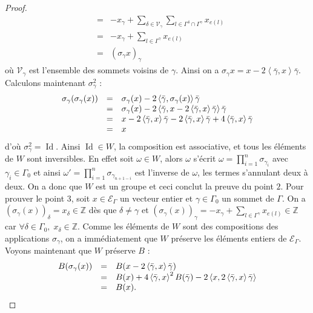 \documentclass[a4paper,11pt]{article}
\DeclareMathOperator{\Id}{Id}
\newcommand{\ps}[2]{\left\langle#1,#2\right\rangle}
\newcommand{\EG}{\mathscr{E}_\Gamma}
\newcommand{\dps}{\displaystyle}
\begin{document}
\begin{proof}
\begin{eqnarray*}
			&=& -x_\gamma+\sum_{\delta\in \mathscr V_\gamma}\sum_{l\in\Gamma^\delta\cap\Gamma^\gamma}x_{e(l)}\\
			&=& -x_\gamma+\sum_{l\in\Gamma^\gamma}x_{e(l)}\\
			&=& (\sigma_\gamma x)_\gamma
		\end{eqnarray*}
			où $\mathscr V_\gamma$ est l'ensemble des sommets voisins de $\gamma$. Ainsi on a $\sigma_\gamma x=x-2\ps{\bar\gamma}{x}\bar\gamma$. Calculons maintenant $\sigma_\gamma^2$ :
			\[
		\begin{array}{>{\dps}r>{\dps}l>{\dps}l}
			\sigma_\gamma(\sigma_\gamma(x))&=& \sigma_\gamma(x)-2\ps{\bar\gamma}{\sigma_\gamma(x)}\bar\gamma\\
			&=& \sigma_\gamma(x)-2\ps{\bar\gamma}{x-2\ps{\bar\gamma}{x}\bar\gamma}\bar\gamma\\
			&=& x-2\ps{\bar\gamma}{x}\bar\gamma-2\ps{\bar\gamma}{x}\bar\gamma+4\ps{\bar\gamma}{x}\bar\gamma\\
			&=& x\\
		\end{array}
			\]
			d'où $\sigma_\gamma^2=\Id$. Ainsi $\Id\in W$, la composition est associative, et tous les éléments de $W$ sont inversibles. En effet soit $\omega\in W$, alors $\omega$ s'écrit $\omega=\prod_{i=1}^n \sigma_{\gamma_i}$ avec $\gamma_i\in\Gamma_0$ et ainsi $\omega'=\prod_{i=1}^n \sigma_{\gamma_{n+1-i}}$ est l'inverse de $\omega$, les termes s'annulant deux à deux. On a donc que $W$ est un groupe et ceci conclut la preuve du point $2$. Pour prouver le point $3$, soit $x\in\EG$ un vecteur entier et $\gamma\in\Gamma_0$ un sommet de $\Gamma$. On a $(\sigma_\gamma(x))_\delta=x_\delta\in\mathbb Z$ dès que $\delta\neq\gamma$ et $(\sigma_\gamma(x))_\gamma=-x_\gamma+\sum_{l\in\Gamma^\gamma}x_{e(l)}\in\mathbb Z$ car $\forall \delta\in\Gamma_0,\;x_\delta\in\mathbb Z$. Comme les éléments de $W$ sont des compositions des applications $\sigma_\gamma$, on a immédiatement que $W$ préserve les éléments entiers de $\EG$. Voyons maintenant que $W$ préserve $B$ :
			\[
		\begin{array}{>{\dps}r>{\dps}l>{\dps}l}
			B(\sigma_\gamma(x))&=& B(x-2\ps{\bar\gamma}{x}\bar\gamma)\\
			&=& B(x)+4\ps{\bar\gamma}{x}^2B(\bar\gamma)-2\ps{x}{2\ps{\bar\gamma}{x}\bar\gamma}\\
			&=& B(x).
		\end{array}
			\]

\end{proof}
\end{document}
